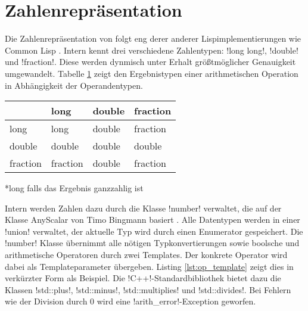 \section{Zahlenrepräsentation}
\label{sec:numbers}

Die Zahlenrepräsentation von \projectname{} folgt eng derer anderer Lispimplementierungen wie Common Lisp \cite[143 -- 144]{graham_ansi_1995}. Intern kennt \projectname{} drei verschiedene Zahlentypen: !long long!, !double! und !fraction!. Diese werden dynmisch unter Erhalt größtmöglicher Genauigkeit umgewandelt. Tabelle \ref{tab:typeconversion} zeigt den Ergebnistypen einer arithmetischen Operation in Abhängigkeit der Operandentypen.
\begin{table}[htbp]
	\centering
	\begin{threeparttable}
		\begin{tabular*}{0.6\linewidth}{l|lll}
					&long	&double	&fraction\\
			\hline
			long		&long	&double	&fraction\\
			double	&double	&double	&double\\
			fraction	&fraction&double	&fraction\tnote{*}\\
		\end{tabular*}
		\begin{tablenotes}
			\item{*}long falls das Ergebnis ganzzahlig ist
		\end{tablenotes}
		\label{tab:typeconversion}
	\end{threeparttable}
\end{table}
Intern werden Zahlen dazu durch die Klasse !number! verwaltet, die auf der Klasse AnyScalar von Timo Bingmann basiert \cite{anyscalar_online}. Alle Datentypen werden in einer !union! verwaltet, der aktuelle Typ wird durch einen Enumerator gespeichert. Die !number! Klasse übernimmt alle nötigen Typkonvertierungen sowie boolsche und arithmetische Operatoren durch zwei Templates. Der konkrete Operator wird dabei als Templateparameter übergeben. Listing \ref{lst:op_template} zeigt dies in verkürzter Form als Beispiel. Die !C++!-Standardbibliothek bietet dazu die Klassen !std::plus!, !std::minus!, !std::multiplies! und !std::divides!. Bei Fehlern wie der Division durch $0$ wird eine !arith_error!-Exception geworfen.
